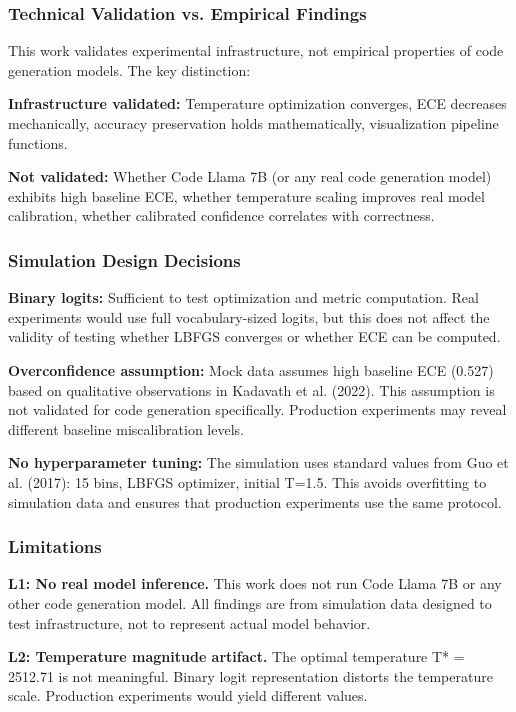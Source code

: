 
\subsubsection{Technical Validation vs. Empirical Findings}

This work validates experimental infrastructure, not empirical properties of code generation models. The key distinction:

\textbf{Infrastructure validated:} Temperature optimization converges, ECE decreases mechanically, accuracy preservation holds mathematically, visualization pipeline functions.

\textbf{Not validated:} Whether Code Llama 7B (or any real code generation model) exhibits high baseline ECE, whether temperature scaling improves real model calibration, whether calibrated confidence correlates with correctness.

\subsubsection{Simulation Design Decisions}

\textbf{Binary logits:} Sufficient to test optimization and metric computation. Real experiments would use full vocabulary-sized logits, but this does not affect the validity of testing whether LBFGS converges or whether ECE can be computed.

\textbf{Overconfidence assumption:} Mock data assumes high baseline ECE (0.527) based on qualitative observations in Kadavath et al. (2022). This assumption is not validated for code generation specifically. Production experiments may reveal different baseline miscalibration levels.

\textbf{No hyperparameter tuning:} The simulation uses standard values from Guo et al. (2017): 15 bins, LBFGS optimizer, initial T=1.5. This avoids overfitting to simulation data and ensures that production experiments use the same protocol.

\subsubsection{Limitations}

\textbf{L1: No real model inference.} This work does not run Code Llama 7B or any other code generation model. All findings are from simulation data designed to test infrastructure, not to represent actual model behavior.

\textbf{L2: Temperature magnitude artifact.} The optimal temperature T* = 2512.71 is not meaningful. Binary logit representation distorts the temperature scale. Production experiments would yield different values.

